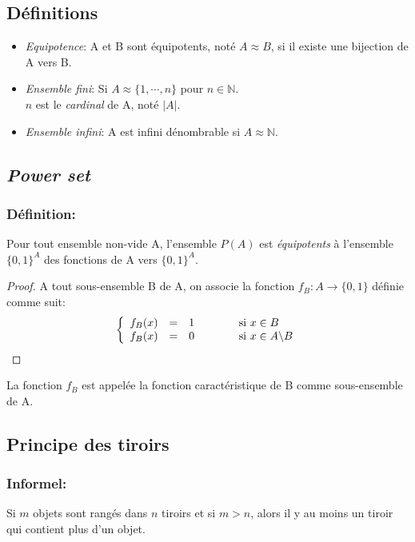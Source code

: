 \subsection{Définitions}
\begin{itemize}
\item \emph{Equipotence}: A et B sont équipotents, noté $A\approx B$, si il existe une bijection de A vers B.\\

\item \emph{Ensemble fini}: Si $A \approx \{1, \cdots , n\}$ pour $n \in \mathbb{N}$.\\
$n$ est le \emph{cardinal} de A, noté $|A|$.\\

\item \emph{Ensemble infini}: A est infini dénombrable si $A \approx \mathbb{N}$.\\

\end{itemize}

\subsection{\emph{Power set}}
\subsubsection*{Définition:}
Pour tout ensemble non-vide A, l'ensemble $P(A)$ est \emph{équipotents} à l'ensemble $\{0, 1\}^{A}$ des fonctions de A vers $\{0, 1\}^{A}$.
\begin{proof}
A tout sous-ensemble B de A, on associe la fonction $f_B : A \rightarrow \{0, 1\}$ définie comme suit:
\[
\left \{
\begin{array}{r c l}
f_B(x) &=& 1 \qquad{\qquad} \text{si } x \in B\\
f_B(x) &=& 0 \qquad{\qquad} \text{si } x \in A \backslash B
\end{array}
\right.
\]
\end{proof}
La fonction $f_B$ est appelée la fonction caractéristique de B comme sous-ensemble de A.
\subsection{Principe des tiroirs}
\subsubsection*{Informel:}
Si $m$ objets sont rangés dans $n$ tiroirs et si $m > n$, alors il y au moins un tiroir qui contient plus d'un objet.
